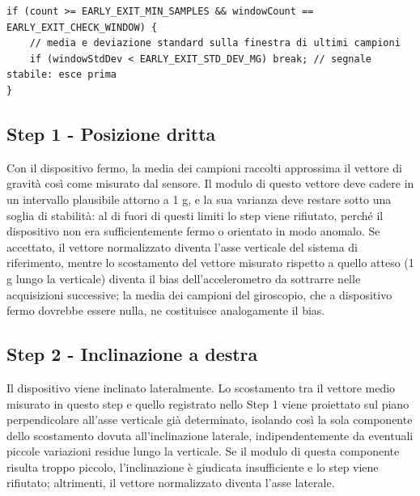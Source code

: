 \begin{listing}[H]
\begin{verbatim}
if (count >= EARLY_EXIT_MIN_SAMPLES && windowCount == EARLY_EXIT_CHECK_WINDOW) {
    // media e deviazione standard sulla finestra di ultimi campioni
    if (windowStdDev < EARLY_EXIT_STD_DEV_MG) break; // segnale stabile: esce prima
}
\end{verbatim}
\caption{Uscita anticipata quando il segnale è già stabile (semplificato)}
\label{listing:calib-early-exit}
\end{listing}

\subsection{Step 1 - Posizione dritta}
Con il dispositivo fermo, la media dei campioni raccolti approssima il vettore
di gravità così come misurato dal sensore. Il modulo di questo vettore deve
cadere in un intervallo plausibile attorno a 1 g, e la sua varianza deve
restare sotto una soglia di stabilità: al di fuori di questi limiti lo step
viene rifiutato, perché il dispositivo non era sufficientemente fermo o
orientato in modo anomalo. Se accettato, il vettore normalizzato diventa
l'asse verticale del sistema di riferimento, mentre lo scostamento del
vettore misurato rispetto a quello atteso (1 g lungo la verticale) diventa il
bias dell'accelerometro da sottrarre nelle acquisizioni successive; la media
dei campioni del giroscopio, che a dispositivo fermo dovrebbe essere nulla,
ne costituisce analogamente il bias.

\subsection{Step 2 - Inclinazione a destra}
Il dispositivo viene inclinato lateralmente. Lo scostamento tra il vettore
medio misurato in questo step e quello registrato nello Step 1 viene
proiettato sul piano perpendicolare all'asse verticale già determinato,
isolando così la sola componente dello scostamento dovuta all'inclinazione
laterale, indipendentemente da eventuali piccole variazioni residue lungo la
verticale. Se il modulo di questa componente risulta troppo piccolo,
l'inclinazione è giudicata insufficiente e lo step viene rifiutato;
altrimenti, il vettore normalizzato diventa l'asse laterale.


